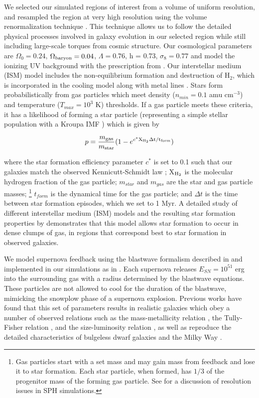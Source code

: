 \documentclass[a4paper,fleqn,usenatbib]{mnras}
\begin{document}
We selected our simulated regions of interest from a volume of
uniform resolution, and resampled the region at very high
resolution using the volume renormalization technique \citep{Katz93}.
This technique allows us to follow the detailed physical processes
involved in galaxy evolution in our selected region while still
including large-scale torques from cosmic structure.  Our cosmological parameters are $\Omega_0 = 0.24$, $\Omega_{\rm baryon} = 0.04$, $\Lambda = 0.76$, h = 0.73, $\sigma_8 = 0.77$ 
 \citep{WMAP3} and model the ionizing UV background
with the prescription from \citet{Haardt96}.  Our interstellar medium (ISM) model includes the non-equilibrium formation and destruction of H$_2$, which is incorporated in the cooling model along with metal lines \citep{Christensen12}.  Stars form
probabilistically from gas particles which meet density ($n_{min} =
0.1$ amu cm$^{-3}$) and temperature ($T_{max} = 10^3$ K) thresholds. If a gas
particle meets these criteria, it has a likelihood of forming a star
particle (representing a simple stellar population with a Kroupa IMF
\citep{Kroupa}) which is given by

\begin{equation}
p = \frac{m_{\rm gas}}{m_{\rm star}} (1 - e^{c^*\rm X_{\rm H_2} \Delta t/t_{\rm form}})
\end{equation}

\noindent
where the star formation efficiency parameter $c^*$ is set to 0.1 such
that our galaxies match the observed Kennicutt-Schmidt law
\citep{Kennicutt89};  X$_{\rm H_2}$ is the molecular hydrogen fraction of the gas particle; $m_{star}$ and $m_{gas}$ are the star and gas
particle masses; \footnote{Gas particles start with a set mass
 and may gain mass from feedback and lose it to star formation.  Each star particle, when
  formed, has $1/3$ of the progenitor mass of the forming gas particle.  See \cite{Christensen10} for a discussion
of resolution issues in SPH simulations.} 
 $t_{form}$ is the dynamical time for the gas
particle; and $\Delta t$ is the time between star formation episodes,
which we set to 1 Myr.  A detailed study of different interstellar medium (ISM) models and the resulting star formation properties by \citet{Christensen14a} demonstrates that this model allows star formation to occur in dense clumps of gas, in regions that correspond best to star formation in observed galaxies.  

We model supernova feedback using the
blastwave formalism described in \citet{McKee77} and implemented in
our simulations as in \citet{Stinson06}.  Each supernova releases
$E_{SN} = 10^{51}$ erg into the surrounding gas with a radius
determined by the blastwave equations.  These particles are not
allowed to cool for the duration of the blastwave, mimicking the
snowplow phase of a supernova explosion.  Previous works have found
that this set of parameters results in realistic galaxies which obey a
number of observed relations such as the mass-metallicity relation
\citep{Brooks07}, %
 the Tully-Fisher relation \citep{Governato09}, and
the size-luminosity relation \citep{Brooks11}, as well as reproduce
the detailed characteristics of bulgeless dwarf galaxies
\citep{Governato10} and the Milky Way \citep{Guedes11}.
\end{document}
